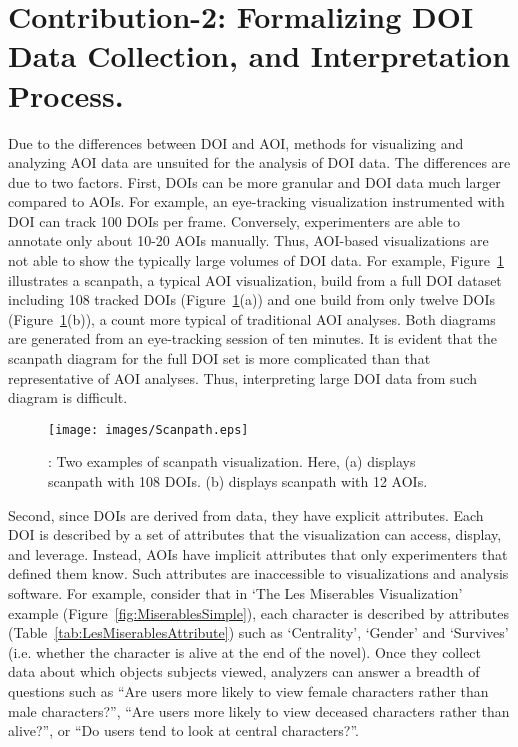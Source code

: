 \section{Contribution-2: Formalizing DOI Data Collection, and Interpretation Process. }
\label{sec:Contrib2}
Due to the differences between DOI and AOI, methods for visualizing and analyzing AOI data are unsuited for the analysis of DOI data. The differences are due to two factors. First, DOIs can be more granular and DOI data much larger compared to AOIs. For example, an eye-tracking visualization instrumented with DOI can track 100 DOIs per frame. Conversely, experimenters are able to annotate only about 10-20 AOIs manually. Thus, AOI-based visualizations are not able to show the typically large volumes of DOI data. For example, Figure~\ref{fig:Scanpath} illustrates a scanpath, a typical AOI visualization,  build from a full DOI dataset including 108 tracked DOIs (Figure~\ref{fig:Scanpath}(a)) and one build from only twelve DOIs (Figure~\ref{fig:Scanpath}(b)), a count more typical of traditional AOI analyses. Both diagrams are generated from an eye-tracking session of ten minutes. It is evident that the scanpath diagram for the full DOI set is more complicated than that representative of AOI analyses. Thus, interpreting large DOI data from such diagram is difficult. 

\begin{figure}[htb]
  \centering
  \texttt{[image: images/Scanpath.eps]}
  \caption{: Two examples of scanpath visualization. Here, (a) displays scanpath with 108 DOIs. (b) displays scanpath with 12 AOIs. }
	\label{fig:Scanpath}
\end{figure}

Second, since DOIs are derived from data, they have explicit attributes. Each DOI is described by a set of attributes that the visualization can access, display, and leverage. Instead, AOIs have implicit attributes that only experimenters that defined them know. Such attributes are inaccessible to visualizations and analysis software. For example, consider that in `The Les Miserables Visualization' example (Figure~\ref{fig:MiserablesSimple}), each character is described by attributes (Table~\ref{tab:LesMiserablesAttribute}) such as `Centrality', `Gender' and `Survives' (i.e. whether the character is alive at the end of the novel). Once they collect data about which objects subjects viewed, analyzers can answer a breadth of questions such as ``Are users more likely to view female characters rather than male characters?'', ``Are users more likely to view deceased characters rather than alive?'', or ``Do users tend to look at central characters?''. 

